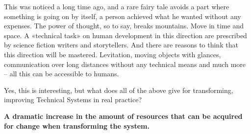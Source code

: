\documentclass[11pt,a4paper]{article}
\begin{document}
This was noticed a long time ago, and a rare fairy tale avoids a part where
something is going on by itself, a person achieved what he wanted without any
expenses.  The power of thought, so to say, breaks mountains. Move in time and
space. A «technical task» on human development in this direction are
prescribed by science fiction writers and storytellers.  And there are reasons
to think that this direction will be mastered. Levitation, moving objects with
glances, communication over long distances without any technical means and
much more -- all this can be accessible to humans.

Yes, this is interesting, but what does all of the above give for
transforming, improving Technical Systems in real practice?

\textbf{A dramatic increase in the amount of resources that can be acquired
  for change when transforming the system.}
\end{document}
